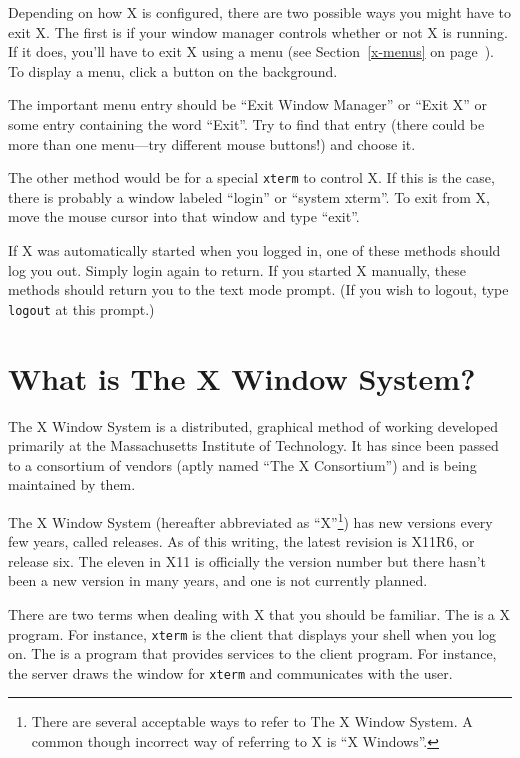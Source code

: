 Depending on how X is configured, there are two possible ways you
might have to exit X.  The first is if your window manager controls
whether or not X is running.  If it does, you'll have to exit X using
a menu (see Section~\ref{x-menus} on page~\pageref{x-menus}).  To
display a menu, click a button on the background.

The important menu entry should be ``Exit Window Manager'' or ``Exit
X'' or some entry containing the word ``Exit''.  Try to find that
entry (there could be more than one menu---try different
mouse buttons!) and choose it.  

The other method would be for a special {\tt xterm} to control X.  If
this is the case, there is probably a window labeled ``login'' or
``system xterm''.  To exit from X, move the mouse cursor into that
window and type ``exit''.

If X was automatically started when you logged in, one of these
methods should log you out.  Simply login again to return.  If you
started X manually, these methods should return you to the text mode
prompt.  (If you wish to logout, type {\tt logout} at this prompt.)

\section{What is The X Window System?}

The X Window System is a distributed, graphical method of working
developed primarily at the Massachusetts Institute of
Technology. It has since
been passed to a consortium of vendors (aptly named ``The X
Consortium'') and is being maintained by them.

The X Window System (hereafter abbreviated as ``X''\footnote{There are
  several acceptable ways to refer to The X Window System.  A common
  though incorrect way of referring to X is ``X Windows''.}) has new
versions every few years, called releases. As of this writing, the
latest revision is X11R6, or release six. The eleven in X11 is
officially the version number but there hasn't been a new version in
many years, and one is not currently planned.

There are two terms when dealing with X that you should be familiar.
The  is a X program. For instance, {\tt xterm} is the
client that displays your shell when you log on.  The 
is a program that provides services to the client program. For
instance, the server draws the window for {\tt xterm} and communicates
with the user.

